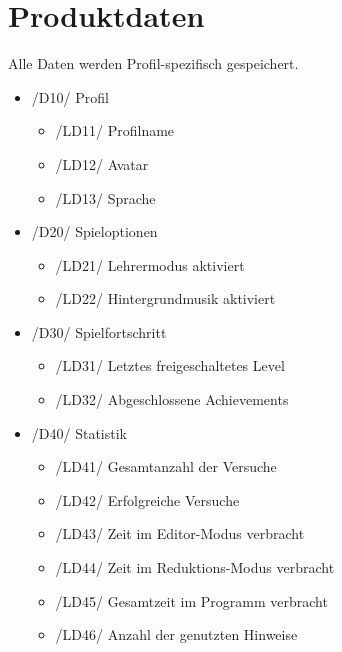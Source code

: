 \section{Produktdaten}

Alle Daten werden Profil-spezifisch gespeichert.

\begin{itemize}

\item /D10/ Profil
\begin{itemize}
\item /LD11/ Profilname
\item /LD12/ Avatar
\item /LD13/ Sprache
\end{itemize}

\item /D20/ Spieloptionen
\begin{itemize}
\item /LD21/ Lehrermodus aktiviert
\item /LD22/ Hintergrundmusik aktiviert
\end{itemize}

\item /D30/ Spielfortschritt
\begin{itemize}
\item /LD31/ Letztes freigeschaltetes Level
\item /LD32/ Abgeschlossene Achievements
\end{itemize}

\item /D40/ Statistik
\begin{itemize}
\item /LD41/ Gesamtanzahl der Versuche
\item /LD42/ Erfolgreiche Versuche
\item /LD43/ Zeit im Editor-Modus verbracht
\item /LD44/ Zeit im Reduktions-Modus verbracht
\item /LD45/ Gesamtzeit im Programm verbracht
\item /LD46/ Anzahl der genutzten Hinweise
\end{itemize}

\end{itemize}